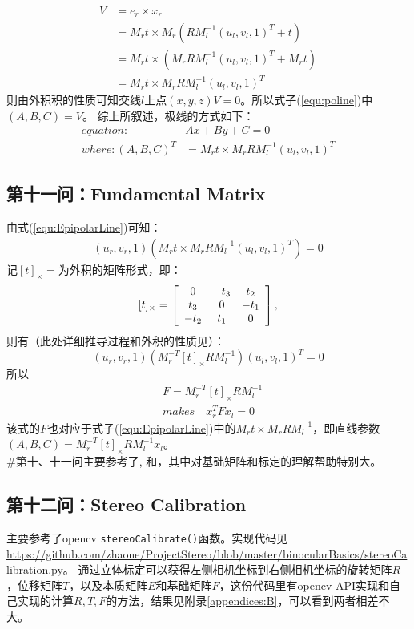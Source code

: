\documentclass[UTF8]{ctexart}
\begin{document}
\begin{align*}
V&=e_r \times x_r\\
&=M_rt \times M_r(RM_l^{-1}(u_l,v_l,1)^T+t)\\
&=M_rt \times (M_rRM_l^{-1}(u_l,v_l,1)^T+M_rt)\\
&=M_rt \times M_rRM_l^{-1}(u_l,v_l,1)^T
\end{align*}
则由外积积的性质可知交线$l$上点$(x,y,z)V=0$。所以式子(\ref{equ:poline})中$(A,B,C)=V$。
综上所叙述，极线的方式如下：
\begin{equation}
\begin{aligned}
equation:\qquad&Ax+By+C=0\\
where:(A,B,C)^T&=M_rt \times M_rRM_l^{-1}(u_l,v_l,1)^T\label{equ:EpipolarLine}
\end{aligned}
\end{equation}
\subsection{第十一问：Fundamental Matrix}
由式(\ref{equ:EpipolarLine})可知：
\begin{align}
(u_r,v_r,1)(M_rt \times M_rRM_l^{-1}(u_l,v_l,1)^T)=0
\end{align}
记$[t]_{\times}=$为外积的矩阵形式，即\cite{wikifundamentalMatrix180903}：
$$
[t]_{\times}=\left [ \begin{array}{ c c c}
0   & -t_3  & t_2 \\
t_3 & 0 & -t_1 \\
-t_2& t_1 & 0
\end{array} \right ],
$$
则有（此处详细推导过程和外积的性质见\cite{researchgate180903}）：
$$
(u_r,v_r,1)(M_r^{-T}[t]_{\times}RM_l^{-1})(u_l,v_l,1)^T=0
$$
所以
\begin{align}
&F=M_r^{-T}[t]_{\times}RM_l^{-1}\\
&makes\quad x_r^TFx_l=0\label{equ:epipolarlineF}
\end{align}
该式的$F$也对应于式子(\ref{equ:EpipolarLine})中的$M_rt \times M_rRM_l^{-1}$，即直线参数$(A,B,C)=M_r^{-T}[t]_{\times}RM_l^{-1}x_l$。\\
\#第十、十一问主要参考了\cite{researchgate180903},\cite{wikifundamentalMatrix180903} 和\cite{stereoVersion180903}，其中\cite{researchgate180903}对基础矩阵和标定的理解帮助特别大。
\subsection{第十二问：Stereo Calibration}
主要参考了opencv \verb"stereoCalibrate()"函数\cite{opencvCameraCalibrationl18830}。实现代码见\url{https://github.com/zhaone/ProjectStereo/blob/master/binocularBasics/stereoCalibration.py}。 通过立体标定可以获得左侧相机坐标到右侧相机坐标的旋转矩阵$R$，位移矩阵$T$，以及本质矩阵$E$和基础矩阵$F$，这份代码里有opencv API实现和自己实现的计算$R,T,F$的方法，结果见附录\ref{appendices:B}，可以看到两者相差不大。
\end{document}
